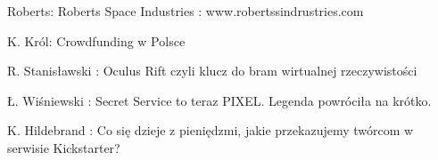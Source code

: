 \documentclass[12pt, a4paper]{article}
\begin{document}
\newpage


\begin{thebibliography}{99}

 Roberts: Roberts Space Industries : www.robertssindrustries.com

 K. Król: Crowdfunding w Polsce 

 R. Stanisławski : Oculus Rift czyli klucz do bram wirtualnej rzeczywistości

 Ł. Wiśniewski : Secret Service to teraz PIXEL. Legenda powróciła na krótko.

 K. Hildebrand : Co się dzieje z pieniędzmi, jakie przekazujemy twórcom w serwisie Kickstarter?

\end{thebibliography}

\printindex
\end{document}
